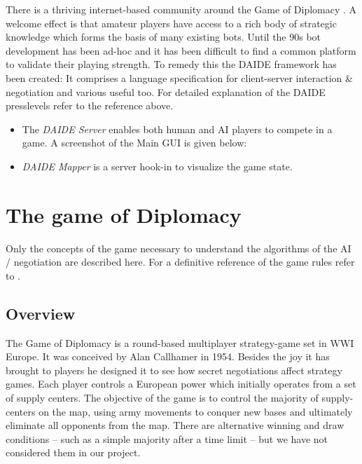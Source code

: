 \documentclass[pdftex,11pt,a4paper]{report}
\begin{document}
There is a thriving internet-based community around the Game of
Diplomacy \cite{DipArchive04} \cite{DipPouch04}. A welcome effect is
that amateur players have access to a rich body of strategic knowledge
which forms the basis of many existing bots. Until the 90s bot
development has been ad-hoc and it has been difficult to find a common
platform to validate their playing strength. To remedy this the DAIDE
framework \cite{Daide04} has been created: It comprises a language
specification for client-server interaction \cite{DAIDEsyntax10} \&
negotiation and various useful too. For detailed explanation of the 
DAIDE presslevels refer to the reference above.

\begin{itemize}

\item The \textit{DAIDE Server} enables both human and AI players to
      compete in a game. A screenshot of the Main GUI is given below:

\item \textit{DAIDE Mapper} is a server hook-in to visualize
      the game state.

\end{itemize}



\pagebreak

\chapter{The game of Diplomacy}

Only the concepts of the game necessary to understand the 
algorithms of the AI / negotiation are described here. For a
definitive reference of the game rules refer to \cite{DiploRules00}.

\section{Overview}

The Game of Diplomacy is a round-based multiplayer strategy-game set
in WWI Europe. It was conceived by Alan Callhamer in 1954. Besides
the joy it has brought to players he designed it to see how 
secret negotiations affect strategy games. Each player controls a 
European power which initially operates from a set of supply centers.
The objective of the game is to control the majority of supply-centers
on the map, using army movements to conquer new bases and ultimately
eliminate all opponents from the map. There are alternative winning
and draw conditions -- such as a simple majority after a time limit -- 
but we have not considered them in our project.
\end{document}

